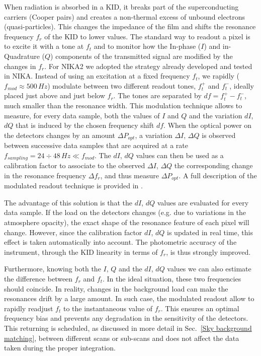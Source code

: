 \documentclass[]{aa} %
\begin{document}
When radiation is absorbed in a KID, it breaks part of the superconducting carriers (Cooper pairs) and creates a non-thermal excess of unbound electrons (quasi-particles). This changes the impedance of the film and shifts the resonance frequency $f_r$ of the KID to lower values.
The standard way to readout a pixel is to excite it with a tone at $f_t$ and to monitor how the In-phase ($I$) and in-Quadrature ($Q$) components of the transmitted signal are modified by the changes in $f_r$. For NIKA2 we adopted the strategy already developed and tested in NIKA. Instead of using an excitation at a fixed frequency $f_t$, we rapidly ($f_{mod} \approx 500\,Hz$) modulate between two different readout tones, $f_t^+$ and $f_t^-$, ideally placed just above and just below $f_r$. The tones are separated by $df=f_t^+-f_t^-$, much smaller than the resonance width. This modulation technique allows to measure, for every data sample, both the values of $I$ and $Q$ and the variation $dI$, $dQ$ that is induced by the chosen frequency shift $df$. When the optical power on the detectors changes by an amount $\Delta P_{opt}$, a variation $\Delta I$, $\Delta Q$ is observed between successive data samples that are acquired at a rate $f_{sampling} = 24\div48\,Hz \ll  f_{mod} $. The $dI$, $dQ$ values can then be used as a calibration factor to associate to the observed $\Delta I$, $\Delta Q$ the corresponding change in the resonance frequency $\Delta f_r$, and thus measure $\Delta P_{opt}$. A full description of the modulated readout technique is provided in \cite{Calvo2013}.

The advantage of this solution is that the $dI$, $dQ$ values are evaluated for every data sample. If the load on the detectors changes (e.g. due to variations in the atmosphere opacity), the exact shape of the resonance feature of each pixel will change. However, since the calibration factor $dI$, $dQ$ is updated in real time, this effect is taken automatically into account. The photometric accuracy of the instrument, through the KID linearity in terms of $f_r$, is thus strongly improved.

Furthermore, knowing both the $I$, $Q$ and the $dI$, $dQ$ values we can also estimate the difference between $f_r$ and $f_t$. In the ideal situation, these two frequencies should coincide. In reality, changes in the background load can make the resonances drift by a large amount. In such case, the modulated readout allow to rapidly readjust $f_t$ to the instantaneous value of $f_r$. This ensures an optimal frequency bias and prevents any degradation in the sensitivity of the detectors. This returning is scheduled, as discussed in more detail in Sec.~\ref{Sky background matching}, between different scans or sub-scans and does not affect the data taken during the proper integration.
\end{document}

